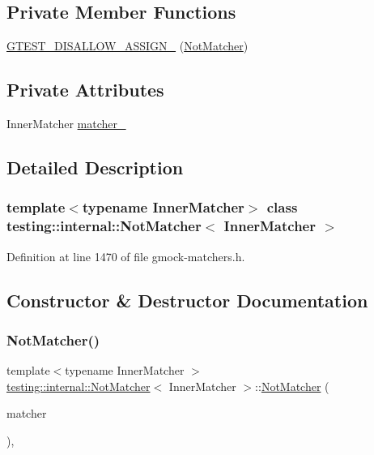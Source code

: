 \subsection*{Private Member Functions}
\begin{DoxyCompactItemize}
\item 
\hyperlink{classtesting_1_1internal_1_1NotMatcher_afab7dbd2d65874fce636f104c09164e6}{G\+T\+E\+S\+T\+\_\+\+D\+I\+S\+A\+L\+L\+O\+W\+\_\+\+A\+S\+S\+I\+G\+N\+\_\+} (\hyperlink{classtesting_1_1internal_1_1NotMatcher}{Not\+Matcher})
\end{DoxyCompactItemize}
\subsection*{Private Attributes}
\begin{DoxyCompactItemize}
\item 
Inner\+Matcher \hyperlink{classtesting_1_1internal_1_1NotMatcher_aa6b7d0db2877713a05451b0f8a8c1241}{matcher\+\_\+}
\end{DoxyCompactItemize}


\subsection{Detailed Description}
\subsubsection*{template$<$typename Inner\+Matcher$>$\newline
class testing\+::internal\+::\+Not\+Matcher$<$ Inner\+Matcher $>$}



Definition at line 1470 of file gmock-\/matchers.\+h.



\subsection{Constructor \& Destructor Documentation}
\mbox{\label{classtesting_1_1internal_1_1NotMatcher_a77bd397c9974e4e49acb84eeb624dce1}} 
\subsubsection{\texorpdfstring{Not\+Matcher()}{NotMatcher()}}
{\footnotesize\ttfamily template$<$typename Inner\+Matcher $>$ \\
\hyperlink{classtesting_1_1internal_1_1NotMatcher}{testing\+::internal\+::\+Not\+Matcher}$<$ Inner\+Matcher $>$\+::\hyperlink{classtesting_1_1internal_1_1NotMatcher}{Not\+Matcher} (\begin{DoxyParamCaption}\item[{Inner\+Matcher}]{matcher }\end{DoxyParamCaption})\hspace{0.3cm}{\ttfamily [inline]}, {\ttfamily [explicit]}}



